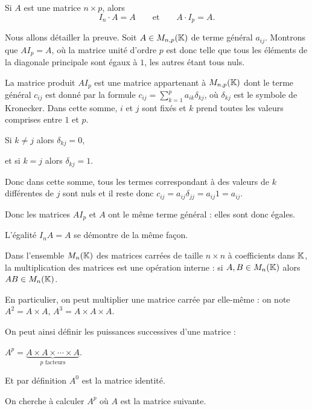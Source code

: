 Si $A$ est une matrice $n \times p$, alors 
$$ I_n \cdot A = A \qquad \text{et} \qquad A \cdot I_p = A.$$

\change

Nous allons détailler la preuve.
Soit  $A \in M_{n,p}(\mathbb{K})$ de terme général $a_{ij}$. Montrons que $AI_p=A$, où la matrice unité d'ordre $p$ est donc telle que tous les éléments de la diagonale principale sont égaux à $1$, les autres étant tous nuls. 

\change
La matrice produit $AI_{p}$ est une matrice appartenant à $M_{n,p}(\mathbb{K})$
dont le terme général $c_{ij}$ est donné par la formule 
$c_{ij}={\displaystyle \sum_{k=1}^{p}a_{ik}\delta_{kj}}$, où $\delta_{kj}$ est le symbole de Kronecker. Dans cette somme, $i$ et $j$ sont fixés et $k$ prend toutes les valeurs comprises entre $1$ et $p$. 

\change
Si $k\neq j$ alors $\delta_{kj}=0$,

\change
et si $k=j$ alors $\delta_{kj}=1$.

\change
Donc dans cette somme, tous les termes correspondant à des valeurs de $k$ différentes de $j$ 
sont nuls et il reste donc $c_{ij}=a_{ij}\delta_{jj}=a_{ij}1=a_{ij}$.

\change
Donc les matrices $AI_{p}$ et $A$ ont le même terme général : elles sont donc égales.

\change
L'égalité $I_{n}A=A$ se démontre de la même façon.


\diapo

Dans l'ensemble $M_{n}(\mathbb{K})$ des matrices carrées de taille $n \times n$ à
coefficients dans $\mathbb{K}$,  la multiplication des matrices est une  
opération interne : si $A,B \in M_n(\mathbb{K})$ alors $AB \in M_n(\mathbb{K})$.

\change
En particulier, on peut multiplier une matrice carrée par elle-même :
on note $A^2 = A \times A$, $A^3 = A \times A \times A$.

\change
On peut ainsi définir les puissances successives d'une matrice :

$A^p = \underbrace{A \times A \times \cdots \times A}_{p \text{ facteurs}}$.

\change

Et par définition $A^0$ est la matrice identité.


\diapo

On cherche à calculer $A^{p}$ où $A$ est la matrice suivante.

